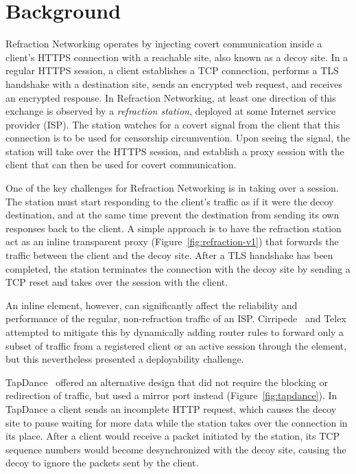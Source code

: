 \section{Background}

Refraction Networking operates by injecting covert communication inside a
client's HTTPS connection with a reachable site, also known as a decoy site. In
a regular HTTPS session, a client establishes a TCP connection, performs a TLS
handshake with a destination site, sends an encrypted web request, and
receives an encrypted response. In Refraction Networking, at least one direction
of this exchange is observed by a \emph{refraction station}, deployed at
some Internet service provider (ISP). The station watches for a covert signal from
the client that this connection is to be used for censorship circumvention.
Upon seeing the signal, the station will take over the HTTPS session,
and establish a proxy session with the client that can then be used for covert
communication.

\FigEvolution

One of the key challenges for Refraction Networking is in taking over a session. The station must start responding to the client's traffic as if it were the decoy destination, and at the same time prevent the destination from sending its own responses back to the client. A simple approach is to have the refraction station act as an inline transparent proxy (Figure~\ref{fig:refraction-v1}) that forwards the traffic between the client and the decoy site. After a TLS handshake has been completed, the station terminates the connection with the decoy site by sending a TCP reset and takes over the session with the client.

An inline element, however, can significantly affect the reliability and performance of the regular, non-refraction traffic of an ISP. Cirripede~\cite{cirripede11} and Telex~\cite{telex11} attempted to mitigate this by dynamically adding router rules to forward only a subset of traffic from a registered client or an active session through the element, but this nevertheless presented a deployability challenge.

TapDance~\cite{tapdance14} offered an alternative design that did not require the blocking or redirection of traffic, but used a mirror port instead (Figure~\ref{fig:tapdance}). In TapDance a client sends an incomplete HTTP request, which causes the decoy site to pause waiting for more data while the station takes over the connection in its place. After a client would receive a packet initiated by the station, its TCP sequence numbers would become desynchronized with the decoy site, causing the decoy to ignore the packets sent by the client.

